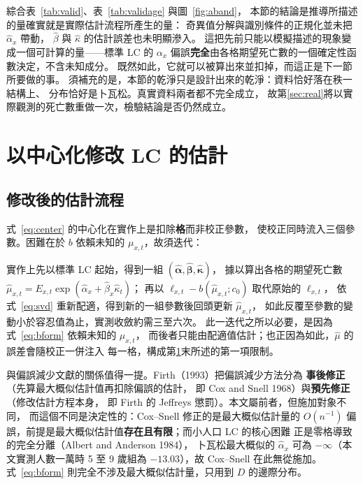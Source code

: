 \documentclass[UTF8, fontset=macnew, a4paper, 12pt]{ctexart}
\begin{document}
綜合表~\ref{tab:valid}、表~\ref{tab:validage} 與圖~\ref{fig:aband}，
本節的結論是推導所描述的量確實就是實際估計流程所產生的量：
奇異值分解與識別條件的正規化並未把 $\hat\alpha_x$ 帶動，
$\hat\beta$ 與 $\hat\kappa$ 的估計誤差也未明顯滲入。
這把先前只能以模擬描述的現象變成一個可計算的量——標準 LC 的 $\alpha_x$
偏誤\textbf{完全}由各格期望死亡數的一個確定性函數決定，不含未知成分。
既然如此，它就可以被算出來並扣掉，而這正是下一節所要做的事。
須補充的是，本節的乾淨只是設計出來的乾淨：資料恰好落在秩一結構上、
分布恰好是卜瓦松。真實資料兩者都不完全成立，
故第\ref{sec:real}將以實際觀測的死亡數重做一次，檢驗結論是否仍然成立。

\section{以中心化修改 LC 的估計}\label{sec:result}

\subsection{修改後的估計流程}

式~\eqref{eq:center} 的中心化在實作上是扣除\textbf{格}而非校正參數，
使校正同時流入三個參數。困難在於 $b$ 依賴未知的 $\mu_{x,t}$，故須迭代：

實作上先以標準 LC 起始，得到一組
$(\hat{\boldsymbol\alpha},\hat{\boldsymbol\beta},\hat{\boldsymbol\kappa})$，
據以算出各格的期望死亡數
$\hat\mu_{x,t}=E_{x,t}\exp(\hat\alpha_x+\hat\beta_x\hat\kappa_t)$；
再以 $\ell_{x,t}-b(\hat\mu_{x,t};c_0)$ 取代原始的 $\ell_{x,t}$，
依式~\eqref{eq:svd} 重新配適，得到新的一組參數後回頭更新 $\hat\mu_{x,t}$，
如此反覆至參數的變動小於容忍值為止，實測收斂約需三至六次。
此一迭代之所以必要，是因為式~\eqref{eq:bform} 依賴未知的 $\mu_{x,t}$，
而後者只能由配適值估計；也正因為如此，$\hat\mu$ 的誤差會隨校正一併注入
每一格，構成第\ref{sec:result}末所述的第一項限制。

與偏誤減少文獻的關係值得一提。Firth（1993）把偏誤減少方法分為
\textbf{事後修正}（先算最大概似估計值再扣除偏誤的估計，
即 Cox and Snell 1968）與\textbf{預先修正}（修改估計方程本身，
即 Firth 的 Jeffreys 懲罰）。本文屬前者，但施加對象不同，
而這個不同是決定性的：Cox--Snell 修正的是最大概似估計量的 $O(n^{-1})$
偏誤，前提是最大概似估計值\textbf{存在且有限}；而小人口 LC 的核心困難
正是零格導致的完全分離（Albert and Anderson 1984），
卜瓦松最大概似的 $\hat\alpha_x$ 可為 $-\infty$（本文實測人數一萬時
5 至 9 歲組為 $-13.03$），故 Cox--Snell 在此無從施加。
式~\eqref{eq:bform} 則完全不涉及最大概似估計量，只用到 $D$ 的邊際分布。
\end{document}
